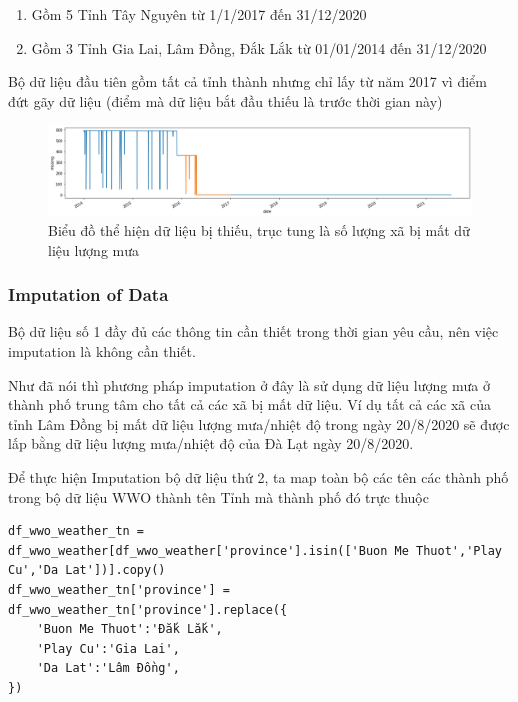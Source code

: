 \documentclass{article}
\begin{document}
\begin{enumerate}
	\item Gồm 5 Tỉnh Tây Nguyên từ 1/1/2017 đến 31/12/2020
	\item Gồm 3 Tỉnh Gia Lai, Lâm Đồng, Đắk Lắk từ 01/01/2014 đến 31/12/2020
\end{enumerate}

Bộ dữ liệu đầu tiên gồm tất cả tỉnh thành nhưng chỉ lấy từ năm 2017 vì điểm đứt gãy dữ liệu (điểm mà dữ liệu bắt đầu thiếu là trước thời gian này)

\begin{figure}[H]
	\centering
	\includegraphics[width=6in]{images/missing_of_rain.png}
	\caption{Biểu đồ thể hiện dữ liệu bị thiếu, trục tung là số lượng xã bị mất dữ liệu lượng mưa}
\end{figure}

\subsubsection{Imputation of Data}

Bộ dữ liệu số 1 đầy đủ các thông tin cần thiết trong thời gian yêu cầu, nên việc imputation là không cần thiết.

Như đã nói thì phương pháp imputation ở đây là sử dụng dữ liệu lượng mưa ở thành phố trung tâm cho tất cả các xã bị mất dữ liệu. Ví dụ tất cả các xã của tỉnh Lâm Đồng bị mất dữ liệu lượng mưa/nhiệt độ trong ngày 20/8/2020 sẽ được lấp bằng dữ liệu lượng mưa/nhiệt độ của Đà Lạt ngày 20/8/2020.

Để thực hiện Imputation bộ dữ liệu thứ 2, ta map toàn bộ các tên các thành phố trong bộ dữ liệu WWO thành tên Tỉnh mà thành phố đó trực thuộc
\begin{verbatim}
df_wwo_weather_tn = df_wwo_weather[df_wwo_weather['province'].isin(['Buon Me Thuot','Play Cu','Da Lat'])].copy()
df_wwo_weather_tn['province'] = df_wwo_weather_tn['province'].replace({
    'Buon Me Thuot':'Đắk Lắk',
    'Play Cu':'Gia Lai',
    'Da Lat':'Lâm Đồng',
})
\end{verbatim}
\end{document}

